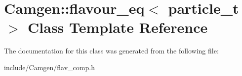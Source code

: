 \hypertarget{a00231}{}\section{Camgen\+:\+:flavour\+\_\+eq$<$ particle\+\_\+t $>$ Class Template Reference}
\label{a00231}


The documentation for this class was generated from the following file\+:\begin{DoxyCompactItemize}
\item 
include/\+Camgen/flav\+\_\+comp.\+h\end{DoxyCompactItemize}
